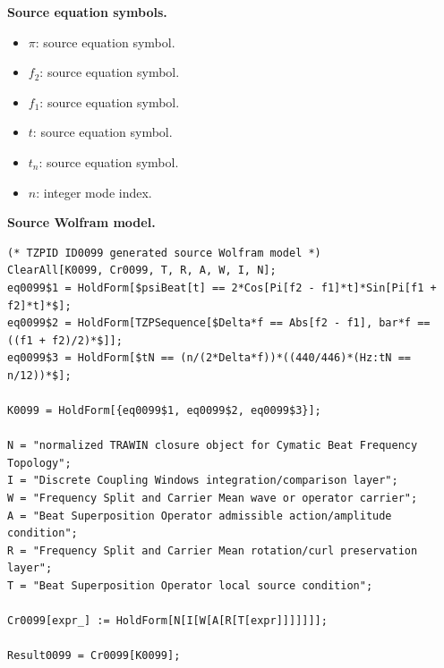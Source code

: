 \begin{minipage}[t]{0.49\linewidth}
\begingroup
\small
\raggedright
\textbf{Source equation symbols.}\par
\begin{itemize}[leftmargin=1.35em,itemsep=1pt,topsep=1pt,parsep=0pt]
    \item $\pi$: source equation symbol.
    \item $f_2$: source equation symbol.
    \item $f_1$: source equation symbol.
    \item $t$: source equation symbol.
    \item $t_n$: source equation symbol.
    \item $n$: integer mode index.
\end{itemize}
\endgroup
\end{minipage}\hfill
\begin{minipage}[t]{0.47\linewidth}
\begingroup
\scriptsize
\raggedright
\textbf{Source Wolfram model.}\par
\begin{Verbatim}[fontsize=\tiny,breaklines=true,breakanywhere=true]
(* TZPID ID0099 generated source Wolfram model *)
ClearAll[K0099, Cr0099, T, R, A, W, I, N];
eq0099$1 = HoldForm[$psiBeat[t] == 2*Cos[Pi[f2 - f1]*t]*Sin[Pi[f1 + f2]*t]*$];
eq0099$2 = HoldForm[TZPSequence[$Delta*f == Abs[f2 - f1], bar*f == ((f1 + f2)/2)*$]];
eq0099$3 = HoldForm[$tN == (n/(2*Delta*f))*((440/446)*(Hz:tN == n/12))*$];

K0099 = HoldForm[{eq0099$1, eq0099$2, eq0099$3}];

N = "normalized TRAWIN closure object for Cymatic Beat Frequency Topology";
I = "Discrete Coupling Windows integration/comparison layer";
W = "Frequency Split and Carrier Mean wave or operator carrier";
A = "Beat Superposition Operator admissible action/amplitude condition";
R = "Frequency Split and Carrier Mean rotation/curl preservation layer";
T = "Beat Superposition Operator local source condition";

Cr0099[expr_] := HoldForm[N[I[W[A[R[T[expr]]]]]]];

Result0099 = Cr0099[K0099];
\end{Verbatim}
\endgroup
\end{minipage}

